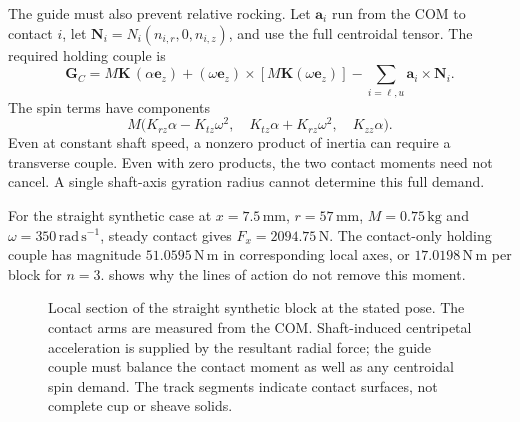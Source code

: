\documentclass[11pt,letterpaper]{article}
\numberwithin{equation}{section}
\newcommand{\er}{\bm e_r}\newcommand{\et}{\bm e_t}\newcommand{\ez}{\bm e_z}
\begin{document}
The guide must also prevent relative rocking. Let $\bm a_i$ run from the COM
to contact $i$, let $\bm N_i=N_i(n_{i,r},0,n_{i,z})$, and use the full
centroidal tensor. The required holding couple is
\begin{equation}
 \boxed{\bm G_C=M\bm K\,(\alpha\ez)
       +(\omega\ez)\times[M\bm K(\omega\ez)]
       -\sum_{i=\ell,u}\bm a_i\times\bm N_i.}
 \label{eq:guide-moment}
\end{equation}
The spin terms have components
\begin{equation}
 M\bigl(K_{rz}\alpha-K_{tz}\omega^2,\quad
        K_{tz}\alpha+K_{rz}\omega^2,\quad K_{zz}\alpha\bigr).
\end{equation}
Even at constant shaft speed, a nonzero product of inertia can require a
transverse couple. Even with zero products, the two contact moments need not
cancel. A single shaft-axis gyration radius cannot determine this full demand.

For the straight synthetic case at $x=7.5\,\mathrm{mm}$,
$r=57\,\mathrm{mm}$, $M=0.75\,\mathrm{kg}$ and
$\omega=350\,\mathrm{rad\,s^{-1}}$, steady contact gives
$F_x=2094.75\,\mathrm N$. The contact-only holding couple has magnitude
$51.0595\,\mathrm{N\,m}$ in corresponding local axes, or
$17.0198\,\mathrm{N\,m}$ per block for $n=3$.
 shows why the lines of action do not remove this moment.

\begin{figure}[htbp]\centering
{}
\caption{Local section of the straight synthetic block at the stated pose.
The contact arms are measured from the COM. Shaft-induced centripetal
acceleration is supplied by the resultant radial force; the guide couple must
balance the contact moment as well as any centroidal spin demand. The track
segments indicate contact surfaces, not complete cup or sheave solids.}
\label{fig:fbd}
\end{figure}
\end{document}
